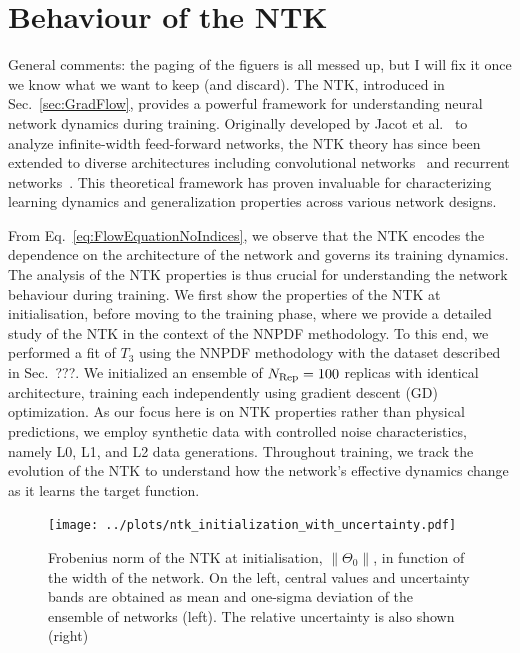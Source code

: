 \section{Behaviour of the NTK}
\label{sec:NTKPheno}

\ac{General comments: the paging of the figuers is all messed up, but I will fix it once we
know what we want to keep (and discard).}
The NTK, introduced in Sec.~\ref{sec:GradFlow}, provides a powerful framework
for understanding neural network dynamics during training. Originally developed
by Jacot et al.~\cite{jacot2018neural} to analyze infinite-width feed-forward
networks, the NTK theory has since been extended to diverse architectures
including convolutional networks~\cite{arora2019exact} and recurrent
networks~\cite{alemohammad2021recurrent}. This theoretical framework has proven
invaluable for characterizing learning dynamics and generalization properties
across various network designs.

From Eq.~\eqref{eq:FlowEquationNoIndices}, we observe that the NTK encodes the
dependence on the architecture of the network and governs its training dynamics.
The analysis of the NTK properties is thus crucial for understanding the network
behaviour during training. We first show the properties of the NTK at
initialisation, before moving to the training phase, where we provide a detailed
study of the NTK in the context of the NNPDF methodology. To this end, we
performed a fit of $T_3$ using the NNPDF methodology with the dataset described
in Sec.~???. We initialized an ensemble of $N_{\rm Rep} = 100$ replicas with
identical architecture, training each independently using gradient descent (GD)
optimization. As our focus here is on NTK properties rather than physical
predictions, we employ synthetic data with controlled noise characteristics,
namely L0, L1, and L2 data generations. Throughout training, we track the
evolution of the NTK to understand how the network's effective dynamics change
as it learns the target function.

\begin{figure}[t!]
  \centering
  \texttt{[image: ../plots/ntk\_initialization\_with\_uncertainty.pdf]}
  \caption{Frobenius norm of the NTK at initialisation, $\lVert \Theta_0
  \rVert$, in function of the width of the network. On the left, central values
  and uncertainty bands are obtained as mean and one-sigma deviation of the
  ensemble of networks (left). The relative uncertainty is also shown (right)}
  \label{fig:NTKInit}
\end{figure}

